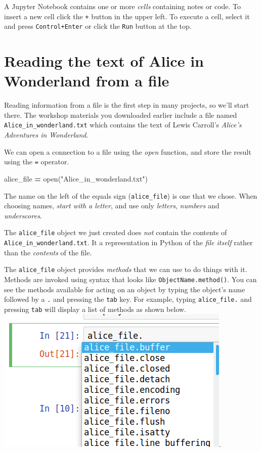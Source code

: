 \documentclass[]{book}
\newenvironment{Shaded}{\begin{snugshade}}{\end{snugshade}}
\newcommand{\StringTok}[1]{\textcolor[rgb]{0.31,0.60,0.02}{#1}}
\newcommand{\OperatorTok}[1]{\textcolor[rgb]{0.81,0.36,0.00}{\textbf{#1}}}
\newcommand{\BuiltInTok}[1]{#1}
\newcommand{\NormalTok}[1]{#1}
\begin{document}
A Jupyter Notebook contains one or more \emph{cells} containing notes or
code. To insert a new cell click the \texttt{+} button in the upper
left. To execute a cell, select it and press \texttt{Control+Enter} or
click the \texttt{Run} button at the top.

\section{Reading the text of Alice in Wonderland from a
file}\label{reading-the-text-of-alice-in-wonderland-from-a-file}

Reading information from a file is the first step in many projects, so
we'll start there. The workshop materials you downloaded earlier include
a file named \texttt{Alice\_in\_wonderland.txt} which contains the text
of Lewis Carroll's \emph{Alice's Adventures in Wonderland}.

We can open a connection to a file using the \emph{open} function, and
store the result using the \texttt{=} operator.

\begin{Shaded}
\begin{Highlighting}[]
\NormalTok{alice_file }\OperatorTok{=} \BuiltInTok{open}\NormalTok{(}\StringTok{"Alice_in_wonderland.txt"}\NormalTok{)}
\end{Highlighting}
\end{Shaded}

The name on the left of the equals sign (\texttt{alice\_file}) is one
that we chose. When choosing names, \emph{start with a letter}, and use
only \emph{letters}, \emph{numbers} and \emph{underscores}.

The \texttt{alice\_file} object we just created does \emph{not} contain
the contents of \texttt{Alice\_in\_wonderland.txt}. It a representation
in Python of the \emph{file itself} rather than the \emph{contents} of
the file.

The \texttt{alice\_file} object provides \emph{methods} that we can use
to do things with it. Methods are invoked using syntax that looks like
\texttt{ObjectName.method()}. You can see the methods available for
acting on an object by typing the object's name followed by a \texttt{.}
and pressing the \texttt{tab} key. For example, typing
\texttt{alice\_file.} and pressing \texttt{tab} will display a list of
methods as shown below.
\includegraphics{Python/PythonIntro/images/notebook_file_completion.png}.
\end{document}
